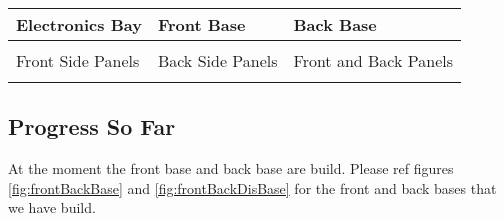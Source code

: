 \documentclass[../../main]{subfiles}
\begin{document}
\begin{center}

    \begin{tabularx} {\textwidth} {
            >{\centering \arraybackslash}X
            >{\centering \arraybackslash}X
            >{\centering \arraybackslash}X
        }

        \toprule

        Electronics Bay & Front Base & Back Base \\ \midrule

        \includegraphics [
            width = 0.3\textwidth,
        ] {pics/elec_bay.png}

        &

        \includegraphics [
            width = 0.3\textwidth,
        ] {pics/front_base.png}

        &

        \includegraphics [
            width = 0.3\textwidth,
        ] {pics/back_base.png}

        \\ \midrule

        Front Side Panels & Back Side Panels & Front and Back Panels \\ \midrule

        \includegraphics [
            width = 0.3\textwidth,
        ] {pics/front_side_panels.png}

        &

        \includegraphics [
            width = 0.3\textwidth,
        ] {pics/back_side_panels.png}

        &

        \includegraphics [
            width = 0.3\textwidth,
        ] {pics/front_back_panels.png}

        \\

        \bottomrule

    \end{tabularx}

    \label{tbl:frameSegments}

\end{center}

\subsection{Progress So Far}

At the moment the front base and back base are build. Please ref figures \ref{fig:frontBackBase} and
\ref{fig:frontBackDisBase} for the front and back bases that we have build.
\end{document}
